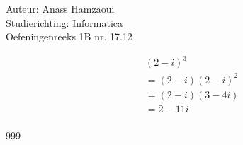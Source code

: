 \documentclass[a4paper]{article}
\begin{document}
  
\noindent \large Auteur: Anass Hamzaoui \\
\noindent \large Studierichting: Informatica \\
\noindent \large Oefeningenreeks 1B nr. 17.12 \\

\medskip

\normalsize

\begin{eqnarray*}
    && (2 - i)^3 \\
    && = (2 - i)(2 - i)^2 \\
    && = (2 - i)(3 - 4i) \\
    && = 2 - 11i \\
\end{eqnarray*}

\begin{thebibliography}{999}
\end{thebibliography}
\end{document}
